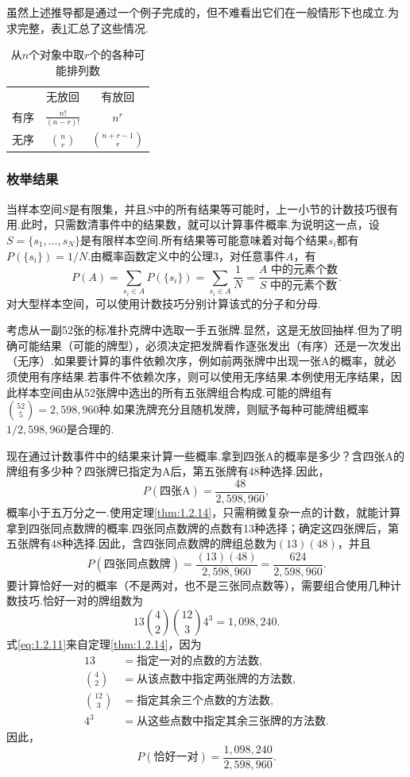 虽然上述推导都是通过一个例子完成的，但不难看出它们在一般情形下也成立.为求完整，表\ref{tab:1.2.1}汇总了这些情况.
\begin{table}[htbp]\centering
\caption{从$n$个对象中取$r$个的各种可能排列数}\label{tab:1.2.1}
\renewcommand{\arraystretch}{1.8}
\begin{tabular}{ccc}\hline
 & 无放回 & 有放回\\
有序 & $\displaystyle\frac{n!}{(n-r)!}$ & $n^r$\\
无序 & $\displaystyle\binom nr$ & $\displaystyle\binom{n+r-1}{r}$\\\hline
\end{tabular}
\end{table}

\subsubsection{枚举结果}\label{sec:1.2.4}
当样本空间$S$是有限集，并且$S$中的所有结果等可能时，上一小节的计数技巧很有用.此时，只需数清事件中的结果数，就可以计算事件概率.为说明这一点，设$S=\{s_1,\ldots,s_N\}$是有限样本空间.所有结果等可能意味着对每个结果$s_i$都有$P(\{s_i\})=1/N$.由概率函数定义中的公理3，对任意事件$A$，有
$$P(A)=\sum_{s_i\in A}P(\{s_i\})=\sum_{s_i\in A}\frac1N=\frac{A\text{ 中的元素个数}}{S\text{ 中的元素个数}}.$$
对大型样本空间，可以使用计数技巧分别计算该式的分子和分母.
\begin{example}[扑克]\label{ex:1.2.18}
考虑从一副52张的标准扑克牌中选取一手五张牌.显然，这是无放回抽样.但为了明确可能结果（可能的牌型），必须决定把发牌看作逐张发出（有序）还是一次发出（无序）.如果要计算的事件依赖次序，例如前两张牌中出现一张A的概率，就必须使用有序结果.若事件不依赖次序，则可以使用无序结果.本例使用无序结果，因此样本空间由从52张牌中选出的所有五张牌组合构成.可能的牌组有$\binom{52}{5}=2,598,960$种.如果洗牌充分且随机发牌，则赋予每种可能牌组概率$1/2,598,960$是合理的.

现在通过计数事件中的结果来计算一些概率.拿到四张A的概率是多少？含四张A的牌组有多少种？四张牌已指定为A后，第五张牌有48种选择.因此，
$$P(\text{四张A})=\frac{48}{2,598,960},$$
概率小于五万分之一.使用定理\ref{thm:1.2.14}，只需稍微复杂一点的计数，就能计算拿到四张同点数牌的概率.四张同点数牌的点数有13种选择；确定这四张牌后，第五张牌有48种选择.因此，含四张同点数牌的牌组总数为$(13)(48)$，并且
$$P(\text{四张同点数牌})=\frac{(13)(48)}{2,598,960}=\frac{624}{2,598,960}.$$
要计算恰好一对的概率（不是两对，也不是三张同点数等），需要组合使用几种计数技巧.恰好一对的牌组数为
\begin{equation}\label{eq:1.2.11}
13\binom42\binom{12}{3}4^3=1,098,240.
\end{equation}
式\eqref{eq:1.2.11}来自定理\ref{thm:1.2.14}，因为
$$\begin{aligned}
13&=\text{指定一对的点数的方法数},\\
\binom42&=\text{从该点数中指定两张牌的方法数},\\
\binom{12}{3}&=\text{指定其余三个点数的方法数},\\
4^3&=\text{从这些点数中指定其余三张牌的方法数}.
\end{aligned}$$
因此，
$$P(\text{恰好一对})=\frac{1,098,240}{2,598,960}.$$
\end{example}

